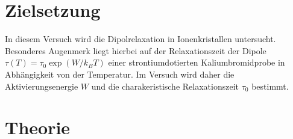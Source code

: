 \section{Zielsetzung}
\label{sec:Zielsetzung}
In diesem Versuch wird die Dipolrelaxation in Ionenkristallen untersucht. Besonderes Augenmerk liegt hierbei auf der Relaxationszeit der Dipole
$\tau(T)=\tau_0 \exp(W/k_BT)$ einer strontiumdotierten Kaliumbromidprobe in Abhängigkeit von der Temperatur.
Im Versuch wird daher die Aktivierungsenergie $W$ und die charakeristische Relaxationszeit $\tau_0$ bestimmt.

\section{Theorie}
\label{sec:Theorie}



